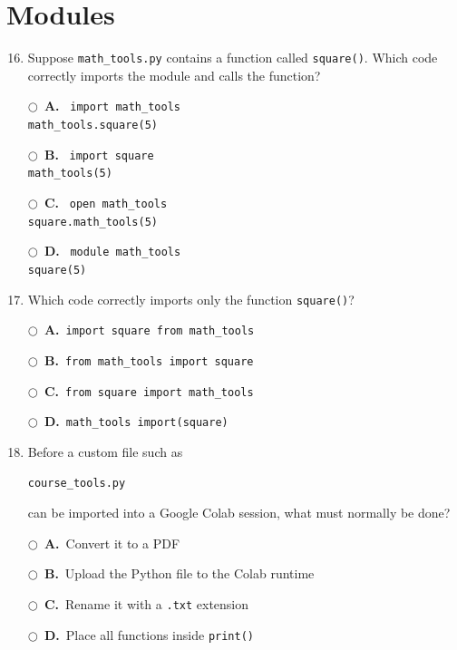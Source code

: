 \documentclass[11pt]{article}
\newcommand{\choice}[2]{%
    \par\noindent
    \(\bigcirc\)\ \textbf{#1.}\ #2
}
\begin{document}
\section*{Modules}

\begin{enumerate}
\setcounter{enumi}{15}


\item Suppose \texttt{math\_tools.py} contains a function called
\texttt{square()}. Which code correctly imports the module and
calls the function?

\choice{A}{
\texttt{import math\_tools}\\
\texttt{math\_tools.square(5)}
}

\choice{B}{
\texttt{import square}\\
\texttt{math\_tools(5)}
}

\choice{C}{
\texttt{open math\_tools}\\
\texttt{square.math\_tools(5)}
}

\choice{D}{
\texttt{module math\_tools}\\
\texttt{square(5)}
}



\item Which code correctly imports only the function
\texttt{square()}?

\choice{A}{\texttt{import square from math\_tools}}

\choice{B}{\texttt{from math\_tools import square}}

\choice{C}{\texttt{from square import math\_tools}}

\choice{D}{\texttt{math\_tools import(square)}}



\item Before a custom file such as

\begin{verbatim}
course_tools.py
\end{verbatim}

can be imported into a Google Colab session, what must normally
be done?

\choice{A}{Convert it to a PDF}

\choice{B}{Upload the Python file to the Colab runtime}

\choice{C}{Rename it with a \texttt{.txt} extension}

\choice{D}{Place all functions inside \texttt{print()}}

\end{enumerate}
\end{document}
